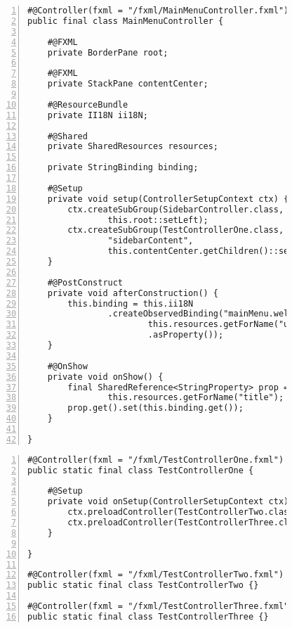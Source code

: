 \begin{figure}[H]
	\begin{lstlisting}[caption=Demo -- \texttt{MainMenuController}, captionpos=b, label=lst:mainmenu_controller, numbers=left, xleftmargin=1.7em, framexleftmargin=1.7em, nolol]
#@Controller(fxml = "/fxml/MainMenuController.fxml")
public final class MainMenuController {

    #@FXML
    private BorderPane root;

    #@FXML
    private StackPane contentCenter;

    #@ResourceBundle
    private II18N ii18N;

    #@Shared
    private SharedResources resources;

    private StringBinding binding;

    #@Setup
    private void setup(ControllerSetupContext ctx) {
        ctx.createSubGroup(SidebarController.class, "sidebar",
				this.root::setLeft);
        ctx.createSubGroup(TestControllerOne.class,
				"sidebarContent",
				this.contentCenter.getChildren()::setAll);
    }

    #@PostConstruct
    private void afterConstruction() {
        this.binding = this.ii18N
				.createObservedBinding("mainMenu.welcome",
						this.resources.getForName("username")
						.asProperty());
    }

    #@OnShow
    private void onShow() {
        final SharedReference<StringProperty> prop = 
				this.resources.getForName("title");
        prop.get().set(this.binding.get());
    }

}
	\end{lstlisting}
\end{figure}
\begin{figure}[H]
	\begin{lstlisting}[caption=Demo -- Alle \texttt{TestController}, captionpos=b, label=lst:test_controllers, numbers=left, xleftmargin=1.7em, framexleftmargin=1.7em, nolol]
#@Controller(fxml = "/fxml/TestControllerOne.fxml")
public static final class TestControllerOne {

    #@Setup
    private void onSetup(ControllerSetupContext ctx) {
        ctx.preloadController(TestControllerTwo.class);
        ctx.preloadController(TestControllerThree.class);
    }

}

#@Controller(fxml = "/fxml/TestControllerTwo.fxml")
public static final class TestControllerTwo {}

#@Controller(fxml = "/fxml/TestControllerThree.fxml")
public static final class TestControllerThree {}
	\end{lstlisting}
\end{figure}
